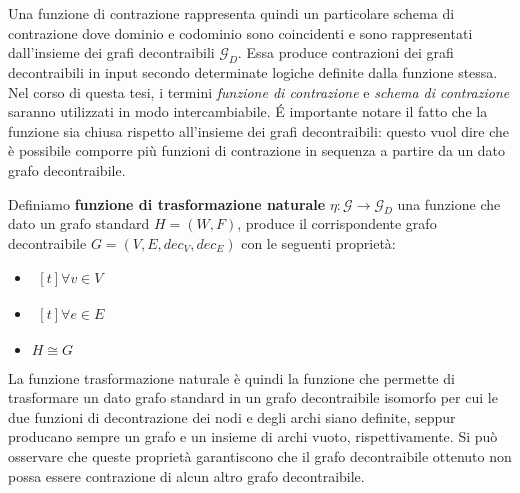 Una funzione di contrazione rappresenta quindi un particolare schema di contrazione dove dominio e codominio sono
coincidenti e sono rappresentati dall'insieme dei grafi decontraibili $\mathcal{G}_D$. Essa produce contrazioni
dei grafi decontraibili in input secondo determinate logiche definite dalla funzione stessa.
Nel corso di questa tesi, i termini \textit{funzione di contrazione} e \textit{schema di contrazione}
saranno utilizzati in modo intercambiabile. \newline
\'E importante notare il fatto che la funzione sia chiusa rispetto all'insieme dei grafi decontraibili: questo vuol
dire che \`e possibile comporre pi\`u funzioni di contrazione in sequenza a partire da un dato grafo decontraibile.
\newline

\begin{definition} 
Definiamo \textbf{funzione di trasformazione naturale} $\eta : \mathcal{G} \rightarrow \mathcal{G}_D$ una funzione che
dato un grafo standard $H = (W, F)$, produce il corrispondente grafo decontraibile $G = (V, E, dec_V, dec_E)$ con le
seguenti propriet\`a:
    \begin{itemize}
        \item {}
        $ \begin{aligned}[t]
        \forall v\in V
        \end{aligned} $
        \item {}
        $ \begin{aligned}[t]
        \forall e\in E
        \end{aligned} $
        \item $H \cong G$
    \end{itemize}
\end{definition}

La funzione trasformazione naturale \`e quindi la funzione che permette di trasformare un dato grafo standard in un
grafo decontraibile isomorfo per cui le due funzioni di decontrazione dei nodi e degli archi siano definite,
seppur producano sempre un grafo e un insieme di archi vuoto, rispettivamente. \newline
Si pu\`o osservare che queste propriet\`a garantiscono che il grafo decontraibile ottenuto non possa essere
contrazione di alcun altro grafo decontraibile. \newline

